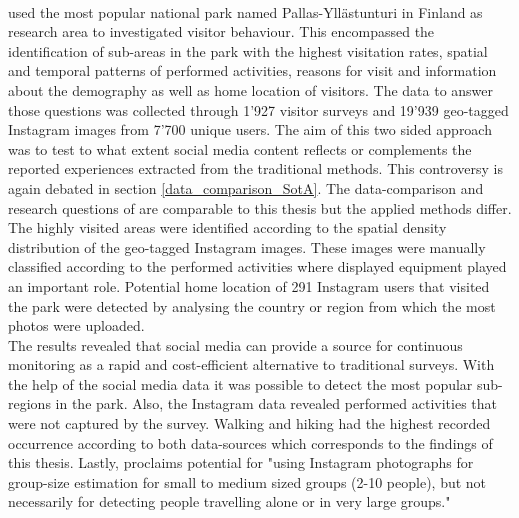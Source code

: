 \paragraph*{\textcite{Heikinheimo2017}} used the most popular national park named Pallas-Yll\"astunturi in Finland as research area to investigated visitor behaviour. This encompassed the identification of sub-areas in the park with the highest visitation rates, spatial and temporal patterns of performed activities, reasons for visit and information about the demography as well as home location of visitors. The data to answer those questions was collected through 1'927 visitor surveys and 19'939 geo-tagged Instagram images from 7'700 unique users. The aim of this two sided approach was to test to what extent social media content reflects or complements the reported experiences extracted from the traditional methods. This controversy is again debated in section \ref{data_comparison_SotA}. The data-comparison and research questions of \textcite{Heikinheimo2017} are comparable to this thesis but the applied methods differ.
The highly visited areas were identified according to the spatial density distribution of the geo-tagged Instagram images. These images were manually classified according to the performed activities where displayed equipment played an important role. Potential home location of 291 Instagram users that visited the park were detected by analysing the country or region from which the most photos were uploaded. \\
The results revealed that social media can provide a source for continuous monitoring as a rapid and cost-efficient alternative to traditional surveys. With the help of the social media data it was possible to detect the most popular sub-regions in the park. Also, the Instagram data revealed performed activities that were not captured by the survey. Walking and hiking had the highest recorded occurrence according to both data-sources which corresponds to the findings of this thesis. Lastly, \textcite{Heikinheimo2017} proclaims potential for "using Instagram photographs for group-size estimation for small to medium sized groups (2-10 people), but not necessarily for detecting people travelling alone or in very large groups." 

